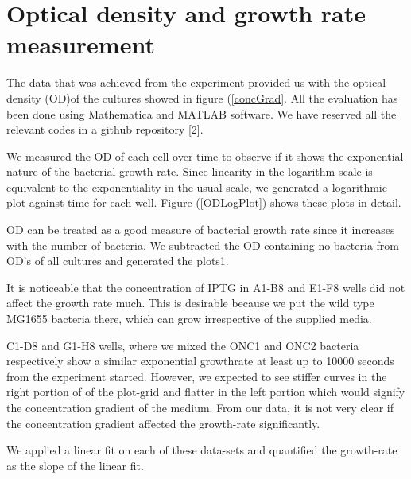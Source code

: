 \documentclass[english,11pt,a4paper]{article}
\begin{document}
\section{Optical density and growth rate measurement}
The data that was achieved from the experiment provided us with the optical density (OD)of the cultures showed in figure (\ref{concGrad}. All the evaluation has been done using Mathematica and MATLAB software. We have reserved all the relevant codes in a github repository [2]. 

We measured the OD of each cell over time to observe if it shows the exponential nature of the bacterial growth rate. Since linearity in the logarithm scale is equivalent to the  exponentiality in the usual scale, we generated a logarithmic plot against time for each well. Figure (\ref{ODLogPlot}) shows these plots in detail.

OD can be treated as a good measure of bacterial growth rate since it increases with the number of bacteria. We subtracted the OD containing no bacteria from OD's of all cultures and generated the plots1. 

It is noticeable that the concentration of IPTG in A1-B8 and E1-F8 wells did not affect the growth rate much. This is desirable because we put the wild type MG1655 bacteria there, which can grow irrespective of the supplied media. 

C1-D8 and G1-H8 wells, where we mixed the ONC1 and ONC2 bacteria respectively show a similar exponential growthrate at least up to 10000 seconds from the experiment started. However, we expected to see stiffer curves in the right portion of of the plot-grid and flatter in the left portion which would signify the concentration gradient of the medium. From our data, it is not very clear if the concentration gradient affected the growth-rate significantly. 



We applied a linear fit on each of these data-sets and quantified the growth-rate as the slope of the linear fit. 
\end{document}
